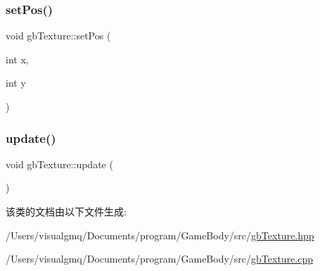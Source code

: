 \subsubsection{\texorpdfstring{setPos()}{setPos()}}
{\footnotesize\ttfamily void gb\+Texture\+::set\+Pos (\begin{DoxyParamCaption}\item[{int}]{x,  }\item[{int}]{y }\end{DoxyParamCaption})}

\mbox{\label{classgb_texture_a0102b5ab04aab53da3a696d21bb92d76}} 
\subsubsection{\texorpdfstring{update()}{update()}}
{\footnotesize\ttfamily void gb\+Texture\+::update (\begin{DoxyParamCaption}{ }\end{DoxyParamCaption})\hspace{0.3cm}{\ttfamily [virtual]}}



该类的文档由以下文件生成\+:\begin{DoxyCompactItemize}
\item 
/\+Users/visualgmq/\+Documents/program/\+Game\+Body/src/\mbox{\hyperlink{gb_texture_8hpp}{gb\+Texture.\+hpp}}\item 
/\+Users/visualgmq/\+Documents/program/\+Game\+Body/src/\mbox{\hyperlink{gb_texture_8cpp}{gb\+Texture.\+cpp}}\end{DoxyCompactItemize}
